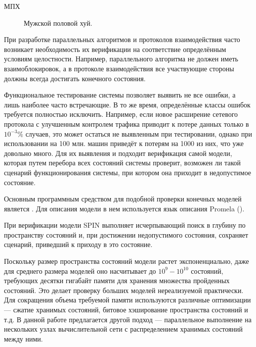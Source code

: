 \documentclass[utf8]{G7-32}
\begin{document}
\frontmatter

\begin{abstract}

\end{abstract}

\tableofcontents

\Abbreviations
\begin{description}
\item[МПХ] Мужской половой хуй.
\end{description}

\Introduction

При разработке параллельных алгоритмов и протоколов взаимодействия
часто возникает необходимость их верификации на соответствие
определённым условиям целостности. Например, параллельного алгоритма
не должен иметь взаимоблокировок, а в протоколе взаимодействия все
участвующие стороны должны всегда достигать конечного состояния.

Функциональное тестирование системы позволяет выявить не все ошибки, а
лишь наиболее часто встречающие. В то же время, определённые классы
ошибок требуется полностью исключить. Например, если новое расширение
сетевого протокола с улучшенным контролем трафика приводит к потере
данных только в $10^{-3}\%$ случаев, это может остаться не выявленным при
тестировании, однако при использовании на 100 млн. машин приведёт к
потерям на 1000 из них, что уже довольно много. Для их выявления и
подходит верификация самой модели, которая путем перебора всех
состояний системы проверит, возможен ли такой сценарий
функционирования системы, при котором она приходит в недопустимое
состояние.

Основным программным средством для подобной проверки конечных моделей
является . Для описания модели в нем используется язык описания
Promela (). 

При верификации модели SPIN выполняет исчерпывающий поиск в глубину по
пространству состояний и, при достижении недопустимого состояния,
сохраняет сценарий, приведший к приходу в это состояние.

Поскольку размер пространства состояний модели растет экспоненциально,
даже для среднего размера моделей оно насчитывает до $10^9 - 10^{10}$
состояний, требующих десятки гигабайт памяти для хранения множества
пройденных состояний. Это делает проверку больших моделей
нереализуемой практически. Для сокращения объема требуемой памяти
используются различные оптимизации — сжатие хранимых состояний,
битовое хэширование пространства состояний и т.д. В
данной работе предлагается другой подход — параллельное выполнение на
нескольких узлах вычислительной сети с распределением хранимых
состояний между ними.
\end{document}
